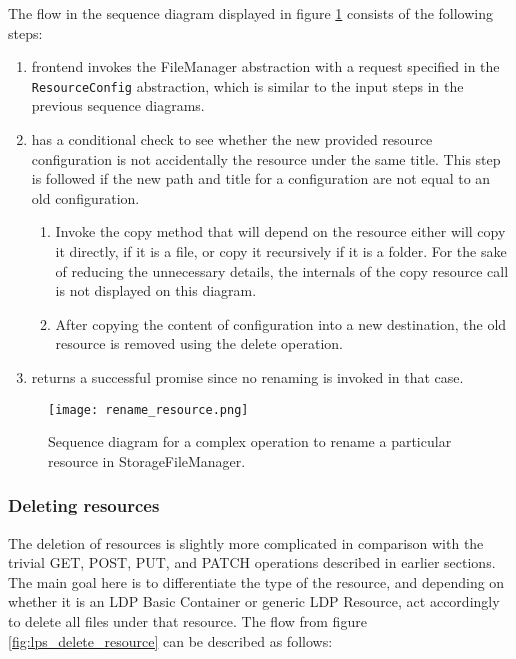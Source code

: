 The flow in the sequence diagram displayed in figure \ref{fig:lps_rename_resource} consists of the following steps:

\begin{enumerate}
    \item \lpa{} frontend invokes the FileManager abstraction with a request specified in the \texttt{ResourceConfig} abstraction, which is similar to the input steps in the previous sequence diagrams. 
    \item \lpas{} has a conditional check to see whether the new provided resource configuration is not accidentally the resource under the same title. This step is followed if the new path and title for a configuration are not equal to an old configuration.
        \begin{enumerate}
        \item Invoke the copy method that will depend on the resource either will copy it directly, if it is a file, or copy it recursively if it is a folder. For the sake of reducing the unnecessary details, the internals of the copy resource call is not displayed on this diagram.
        \item After copying the content of configuration into a new destination, the old resource is removed using the delete operation.
        \end{enumerate}
    \item \lpas{} returns a successful promise since no renaming is invoked in that case. 
\end{enumerate}

\begin{figure}[h]
\centering
\texttt{[image: rename\_resource.png]}
\caption{Sequence diagram for a complex operation to rename a particular resource in StorageFileManager.}
\label{fig:lps_rename_resource}
\end{figure}

\subsubsection{Deleting resources}

The deletion of resources is slightly more complicated in comparison with the trivial GET, POST, PUT, and PATCH operations described in earlier sections. The main goal here is to differentiate the type of the resource, and depending on whether it is an LDP Basic Container or generic LDP Resource, act accordingly to delete all files under that resource. 
The flow from figure \ref{fig:lps_delete_resource} can be described as follows:

